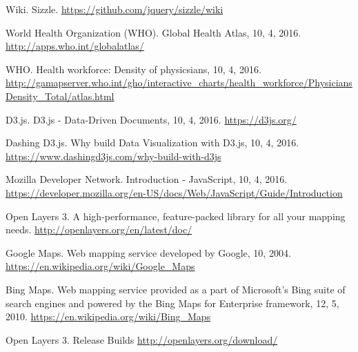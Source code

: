 \documentclass[12pt,a4paper]{article}
\begin{document}
\begin{thebibliography}{}
 Wiki. Sizzle. \url{https://github.com/jquery/sizzle/wiki}

 World Health Organization (WHO). Global Health Atlas, 10, 4, 2016. \url{http://apps.who.int/globalatlas/}

 WHO. Health workforce: Density of physicsians, 10, 4, 2016. \url{http://gamapserver.who.int/gho/interactive_charts/health_workforce/PhysiciansDensity_Total/atlas.html}

 D3.js. D3.js - Data-Driven Documents, 10, 4, 2016. \url{https://d3js.org/}

 Dashing D3.js. Why build Data Visualization with D3.js, 10, 4, 2016. \url{https://www.dashingd3js.com/why-build-with-d3js}

 Mozilla Developer Network. Introduction - JavaScript, 10, 4, 2016. \url{https://developer.mozilla.org/en-US/docs/Web/JavaScript/Guide/Introduction}

 Open Layers 3. A high-performance, feature-packed library for all your mapping needs. \url{http://openlayers.org/en/latest/doc/}

 Google Maps. Web mapping service developed by Google, 10, 2004. \url{https://en.wikipedia.org/wiki/Google_Maps}

 Bing Maps. Web mapping service provided as a part of Microsoft's Bing suite of search engines and powered by the Bing Maps for Enterprise framework, 12, 5, 2010. \url{https://en.wikipedia.org/wiki/Bing_Maps}

 Open Layers 3. Release Builds \url{http://openlayers.org/download/}

\end{thebibliography}
\end{document}
